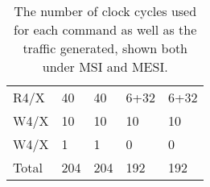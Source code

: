 \begin{table}[h]
\begin{tabular}{l|ll|ll}
R4/X                    & 40                      & 40                        & 6+32                    & 6+32                     \\
W4/X                    & 10                      & 10                        & 10                      & 10                       \\
W4/X                    & 1                       & 1                         & 0                       & 0                        \\ \hline
Total                   & 204                     & 204                       & 192                     & 192
\end{tabular}
\caption{The number of clock cycles used for each command as well as the traffic generated, shown both under MSI and MESI.}
\label{tab:t1ab}
\end{table}
